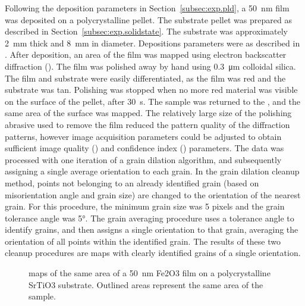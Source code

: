 \documentclass[12pt,%
              twoside,
               letterpaper]{uiothesis}
\begin{document}
Following the deposition parameters in Section~\ref{subsec:exp.pld}, a \SI{50}{\nano\meter}
film was deposited on a polycrystalline \sto{} pellet.  The substrate pellet was prepared
as described in Section~\ref{subsec:exp.solidstate}. The substrate was approximately
\SI{2}{\milli\meter} thick and \SI{8}{\milli\meter} in diameter. Depositions parameters
were as described in . After deposition, an area of the film was
mapped using electron backscatter diffraction (). The film was polished away by
hand using \SI{0.3}{\micro\meter} colloidal silica. The film and substrate were easily
differentiated, as the film was red and the substrate was tan. Polishing was stopped when
no more red material was visible on the surface of the pellet, after
\texttildelow\SI{30}{\second}. The sample was returned to the , and the same
area of the surface was mapped. The relatively large size of the polishing abrasive used
to remove the film reduced the pattern quality of the diffraction patterns, however image
acquisition parameters could be adjusted to obtain sufficient image quality ()
and confidence index () parameters. The data was processed with one iteration of
a grain dilation algorithm, and subsequently assigning a single average orientation to
each grain. In the grain dilation cleanup method, points not belonging to an already
identified grain (based on misorientation angle and grain size) are changed to the
orientation of the nearest grain.  For this procedure, the minimum grain size was 5 pixels
and the grain tolerance angle was 5\si{\degree}. The grain averaging procedure uses a
tolerance angle to identify grains, and then assigns a single orientation to that grain,
averaging the orientation of all points within the identified grain. The results of these
two cleanup procedures are maps with clearly identified grains of a single orientation.


\begin{figure}
\begin{center}
		\caption[ maps of film and substrate]{%
			 maps of the same area of a \SI{50}{\nano\meter}
			Fe2O3 film on a polycrystalline SrTiO3 substrate.
			Outlined areas represent the same area of the sample.}
	\label{fig:subfilmmaps}
\end{center}
\end{figure}
\end{document}

